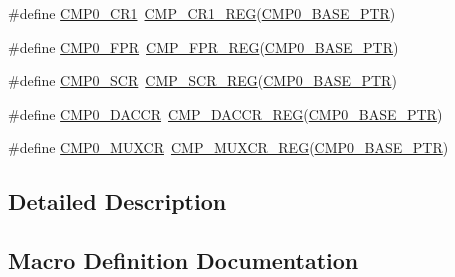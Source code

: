 \begin{DoxyCompactItemize}
\item 
\#define \hyperlink{group___c_m_p___register___accessor___macros_ga993cebfc8cb6bcf6caec49cd75218d17}{C\+M\+P0\+\_\+\+C\+R1}~\hyperlink{group___c_m_p___register___accessor___macros_ga2f761d7412507e4415f230a5e4d972a2}{C\+M\+P\+\_\+\+C\+R1\+\_\+\+R\+EG}(\hyperlink{group___c_m_p___peripheral_ga5a7a6b1d0743a05435ba5cb2dc2b3431}{C\+M\+P0\+\_\+\+B\+A\+S\+E\+\_\+\+P\+TR})
\item 
\#define \hyperlink{group___c_m_p___register___accessor___macros_gafc67824f9a3bc92eaf359c91bf1df5b6}{C\+M\+P0\+\_\+\+F\+PR}~\hyperlink{group___c_m_p___register___accessor___macros_ga343773a1ef97ce5124a805a7e42af104}{C\+M\+P\+\_\+\+F\+P\+R\+\_\+\+R\+EG}(\hyperlink{group___c_m_p___peripheral_ga5a7a6b1d0743a05435ba5cb2dc2b3431}{C\+M\+P0\+\_\+\+B\+A\+S\+E\+\_\+\+P\+TR})
\item 
\#define \hyperlink{group___c_m_p___register___accessor___macros_ga4b5f2afaed69d7a475c7b49e6072c2d1}{C\+M\+P0\+\_\+\+S\+CR}~\hyperlink{group___c_m_p___register___accessor___macros_ga078b884bead12ed9b24c285c8f73fd27}{C\+M\+P\+\_\+\+S\+C\+R\+\_\+\+R\+EG}(\hyperlink{group___c_m_p___peripheral_ga5a7a6b1d0743a05435ba5cb2dc2b3431}{C\+M\+P0\+\_\+\+B\+A\+S\+E\+\_\+\+P\+TR})
\item 
\#define \hyperlink{group___c_m_p___register___accessor___macros_ga35e0e1f16fe611949cc7970ad0119891}{C\+M\+P0\+\_\+\+D\+A\+C\+CR}~\hyperlink{group___c_m_p___register___accessor___macros_ga241a18e5c046627c53ba30229a1a313c}{C\+M\+P\+\_\+\+D\+A\+C\+C\+R\+\_\+\+R\+EG}(\hyperlink{group___c_m_p___peripheral_ga5a7a6b1d0743a05435ba5cb2dc2b3431}{C\+M\+P0\+\_\+\+B\+A\+S\+E\+\_\+\+P\+TR})
\item 
\#define \hyperlink{group___c_m_p___register___accessor___macros_ga5ee1e22a7f08ec3cdad0083a790b10b3}{C\+M\+P0\+\_\+\+M\+U\+X\+CR}~\hyperlink{group___c_m_p___register___accessor___macros_ga61de65bd4b7dc63f96d8c361be243a08}{C\+M\+P\+\_\+\+M\+U\+X\+C\+R\+\_\+\+R\+EG}(\hyperlink{group___c_m_p___peripheral_ga5a7a6b1d0743a05435ba5cb2dc2b3431}{C\+M\+P0\+\_\+\+B\+A\+S\+E\+\_\+\+P\+TR})
\end{DoxyCompactItemize}


\subsection{Detailed Description}


\subsection{Macro Definition Documentation}
